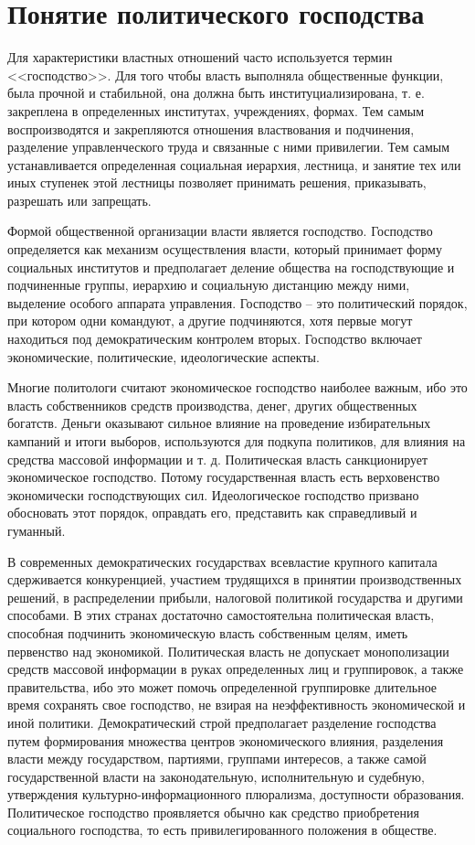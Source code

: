 \section{Понятие политического господства}
Для характеристики властных отношений часто используется термин <<господство>>.
Для того чтобы власть выполняла общественные функции, была прочной и
стабильной, она должна быть институциализирована, т. е. закреплена в
определенных институтах, учреждениях, формах. Тем самым воспроизводятся и
закрепляются отношения властвования и подчинения, разделение управленческого
труда и связанные с ними привилегии. Тем самым устанавливается определенная
социальная иерархия, лестница, и занятие тех или иных ступенек этой лестницы
позволяет принимать решения, приказывать, разрешать или запрещать.

Формой общественной организации власти является господство. Господство
определяется как механизм осуществления власти, который принимает форму
социальных институтов и предполагает деление общества на господствующие и
подчиненные группы, иерархию и социальную дистанцию между ними, выделение
особого аппарата управления. Господство -- это политический порядок, при
котором одни командуют, а другие подчиняются, хотя первые могут находиться под
демократическим контролем вторых. Господство включает экономические,
политические, идеологические аспекты.

Многие политологи считают экономическое господство наиболее важным, ибо это
власть собственников средств производства, денег, других общественных богатств.
Деньги оказывают сильное влияние на проведение избирательных кампаний и итоги
выборов, используются для подкупа политиков, для влияния на средства массовой
информации и т. д. Политическая власть санкционирует экономическое господство.
Потому государственная власть есть верховенство экономически господствующих
сил. Идеологическое господство призвано обосновать этот порядок, оправдать его,
представить как справедливый и гуманный.

В современных демократических государствах всевластие крупного капитала
сдерживается конкуренцией, участием трудящихся в принятии производственных
решений, в распределении прибыли, налоговой политикой государства и другими
способами. В этих странах достаточно самостоятельна политическая власть,
способная подчинить экономическую власть собственным целям, иметь первенство
над экономикой. Политическая власть не допускает монополизации средств массовой
информации в руках определенных лиц и группировок, а также правительства, ибо
это может помочь определенной группировке длительное время сохранять свое
господство, не взирая на неэффективность экономической и иной политики.
Демократический строй предполагает разделение господства путем формирования
множества центров экономического влияния, разделения власти между государством,
партиями, группами интересов, а также самой государственной власти на
законодательную, исполнительную и судебную, утверждения
культурно-информационного плюрализма, доступности образования. Политическое
господство проявляется обычно как средство приобретения социального господства,
то есть привилегированного положения в обществе.

